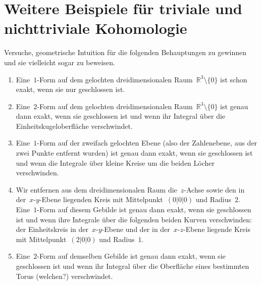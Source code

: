 \documentclass[twoside]{zirkelblatt1415}
\theoremstyle{definition}
\theoremstyle{plain}
\theoremstyle{remark}
\newcommand{\RR}{\mathbb{R}}
\begin{document}
\section{Weitere Beispiele für triviale und nichttriviale Kohomologie}

Versuche, geometrische Intuition für die folgenden Behauptungen zu gewinnen und
sie vielleicht sogar zu beweisen.

\begin{enumerate}
\item Eine~$1$-Form auf dem gelochten dreidimensionalen
Raum~$\RR^3\setminus\{0\}$ ist schon exakt, wenn sie nur geschlossen ist.
\item Eine~$2$-Form auf dem gelochten dreidimensionalen 
Raum~$\RR^3\setminus\{0\}$ ist genau dann exakt, wenn sie geschlossen ist und
wenn ihr Integral über die Einheitskugeloberfläche verschwindet.
\item Eine~$1$-Form auf der zweifach gelochten Ebene (also der Zahlenebene, aus
der zwei Punkte entfernt wurden) ist genau dann exakt, wenn sie geschlossen ist
und wenn die Integrale über kleine Kreise um die beiden Löcher verschwinden.
\item Wir entfernen aus dem dreidimensionalen Raum die~$z$-Achse sowie den in der~$x$-$y$-Ebene
liegenden Kreis mit Mittelpunkt~$(0|0|0)$ und Radius~$2$. Eine~$1$-Form auf
diesem Gebilde ist genau dann exakt, wenn sie geschlossen ist und wenn ihre
Integrale über die folgenden beiden Kurven verschwinden: der Einheitskreis in
der~$x$-$y$-Ebene und der in der~$x$-$z$-Ebene liegende Kreis mit
Mittelpunkt~$(2|0|0)$ und Radius~$1$.
\item Eine~$2$-Form auf demselben Gebilde ist genau dann exakt, wenn sie
geschlossen ist und wenn ihr Integral über die Oberfläche eines bestimmten
Torus (welchen?) verschwindet.
\end{enumerate}
\end{document}

